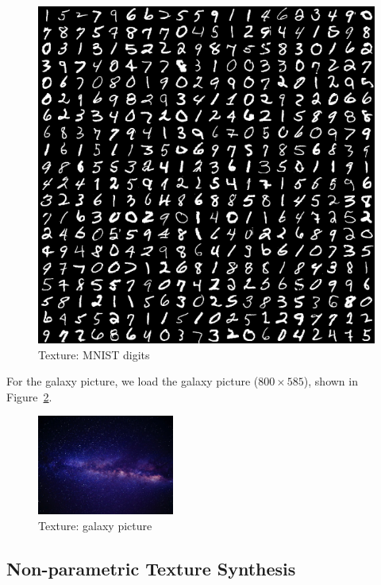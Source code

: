 \documentclass{article}
\begin{document}
\begin{figure}[H]
    \centering
    \includegraphics[scale=0.4]{../Code/Textures/mnist.png}
    \caption{Texture: MNIST digits}
    \label{fig:texture-mnist}
\end{figure}

For the galaxy picture, we load the galaxy picture ($800 \times 585$), shown in Figure~\ref{fig:texture-galaxy}.
\begin{figure}[H]
    \centering
    \includegraphics[width=0.4\textwidth]{../Code/Textures/galaxy.png}
    \caption{Texture: galaxy picture}
    \label{fig:texture-galaxy}
\end{figure}

\subsection{Non-parametric Texture Synthesis}
\end{document}
